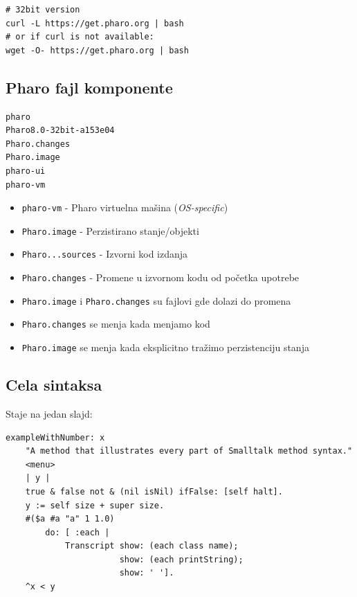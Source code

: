 \documentclass[presentation]{beamer}
\begin{document}
\begin{verbatim}
# 32bit version
curl -L https://get.pharo.org | bash
# or if curl is not available:
wget -O- https://get.pharo.org | bash
\end{verbatim}

\subsection{Pharo fajl komponente}
\label{sec:org17fc3e4}

\begin{verbatim}
pharo
Pharo8.0-32bit-a153e04
Pharo.changes
Pharo.image
pharo-ui
pharo-vm
\end{verbatim}

\begin{itemize}
\item \texttt{pharo-vm} - Pharo virtuelna mašina (\emph{OS-specific})
\item \texttt{Pharo.image} - Perzistirano stanje/objekti
\item \texttt{Pharo...sources} - Izvorni kod izdanja
\item \texttt{Pharo.changes} - Promene u izvornom kodu od početka upotrebe
\end{itemize}

\begin{itemize}
\item \texttt{Pharo.image} i \texttt{Pharo.changes} su fajlovi gde dolazi do promena
\item \texttt{Pharo.changes} se menja kada menjamo kod
\item \texttt{Pharo.image} se menja kada eksplicitno tražimo perzistenciju stanja
\end{itemize}

\subsection{Cela sintaksa}
\label{sec:org16e84c1}

Staje na jedan slajd:

\begin{verbatim}
exampleWithNumber: x
    "A method that illustrates every part of Smalltalk method syntax."
    <menu>
    | y |
    true & false not & (nil isNil) ifFalse: [self halt].
    y := self size + super size.
    #($a #a "a" 1 1.0)
        do: [ :each |
            Transcript show: (each class name);
                       show: (each printString);
                       show: ' '].
    ^x < y
\end{verbatim}
\end{document}
